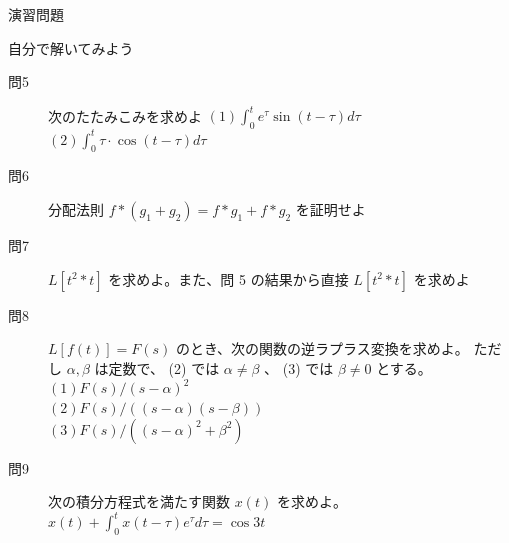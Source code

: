 \documentclass[professionalfonts]{beamer}
\begin{document}
\begin{frame}{演習問題}
  \begin{exampleblock}{自分で解いてみよう}
  \begin{description}
    \item[問5] 次のたたみこみを求めよ
    $(1) \int_{0}^t e^\tau \sin(t-\tau) d\tau$\\
    $(2) \int_{0}^t \tau\cdot \cos(t-\tau) d\tau$\\
    \item[問6] 分配法則 $f*(g_{1}+g_{2}) = f*g_{1} + f*g_{2}$ を証明せよ
    \item[問7] $L[t^{2}*t]$ を求めよ。また、問 5 の結果から直接 $L[t^{2}*t]$ を求めよ
    \item[問8] $L[f(t)] = F(s)$ のとき、次の関数の逆ラプラス変換を求めよ。
    ただし $\alpha, \beta$ は定数で、 (2) では $\alpha \neq \beta$ 、 (3) では $\beta \neq 0$ とする。\\
    $(1) F(s)/(s-\alpha)^{2}$\\
    $(2) F(s)/((s-\alpha)(s-\beta))$\\
    $(3) F(s)/((s-\alpha)^{2}+\beta^{2})$\\
    \item[問9] 次の積分方程式を満たす関数 $x(t)$ を求めよ。
    $x(t) + \int_{0}^t x(t-\tau)e^\tau d\tau = \cos 3t$\\
  \end{description}
  \end{exampleblock}
\end{frame}
\end{document}
